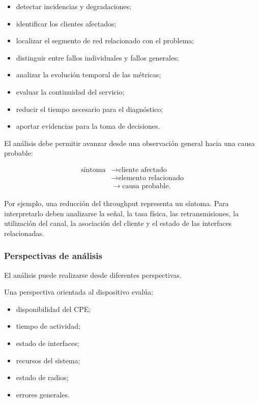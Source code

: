 \begin{itemize}
    \item detectar incidencias y degradaciones;

    \item identificar los clientes afectados;

    \item localizar el segmento de red relacionado con el problema;

    \item distinguir entre fallos individuales y fallos generales;

    \item analizar la evolución temporal de las métricas;

    \item evaluar la continuidad del servicio;

    \item reducir el tiempo necesario para el diagnóstico;

    \item aportar evidencias para la toma de decisiones.
\end{itemize}

El análisis debe permitir avanzar desde una observación general hacia una
causa probable:

\[
\begin{aligned}
    \text{síntoma}
    &\longrightarrow
    \text{cliente afectado}\\
    &\longrightarrow
    \text{elemento relacionado}\\
    &\longrightarrow
    \text{causa probable}.
\end{aligned}
\]

Por ejemplo, una reducción del throughput representa un síntoma. Para
interpretarlo deben analizarse la señal, la tasa física, las
retransmisiones, la utilización del canal, la asociación del cliente y
el estado de las interfaces relacionadas.


\subsubsection*{Perspectivas de análisis}

El análisis puede realizarse desde diferentes perspectivas.

Una perspectiva orientada al dispositivo evalúa:

\begin{itemize}
    \item disponibilidad del CPE;

    \item tiempo de actividad;

    \item estado de interfaces;

    \item recursos del sistema;

    \item estado de radios;

    \item errores generales.
\end{itemize}

